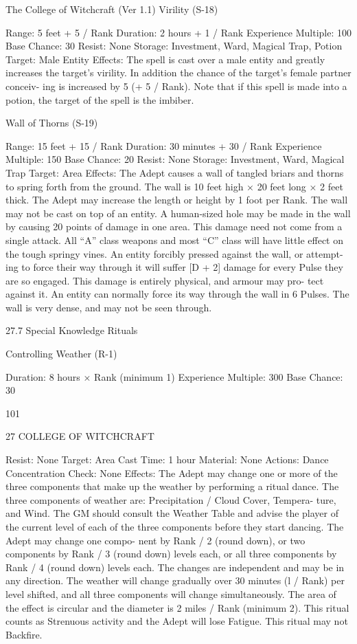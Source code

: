 \begin{Chapter}{The College of Witchcraft (Ver 1.1)}
Virility (S-18) 

Range: 5 feet + 5 / Rank 
Duration: 2 hours + 1 / Rank 
Experience Multiple: 100 
Base Chance: 30%
Resist: None 
Storage: Investment, Ward, Magical Trap, Potion 
Target: Male Entity 
Effects:  The  spell  is  cast  over  a  male  entity  and 
greatly  increases  the  target’s  virility.  In  addition 
the  chance  of  the  target’s  female  partner  conceiv-
ing is increased by 5 (+ 5 / Rank). Note that if this 
spell is made into a potion, the target of the spell is 
the imbiber. 

Wall of Thorns (S-19) 

Range: 15 feet + 15 / Rank 
Duration: 30 minutes + 30 / Rank 
Experience Multiple: 150 
Base Chance: 20%
Resist: None 
Storage: Investment, Ward, Magical Trap 
Target: Area 
Effects:  The  Adept  causes  a  wall  of  tangled  briars 
and  thorns  to  spring  forth  from  the  ground.  The 
wall  is  10  feet  high  ×  20  feet  long  ×  2  feet  thick. 
The  Adept  may  increase  the  length  or  height by  1 
foot per Rank. The wall may not be cast on top of 
an entity. A human-sized hole may be made in the 
wall  by  causing  20  points  of  damage  in  one  area. 
This  damage  need  not  come  from  a  single  attack. 
All  “A”  class  weapons  and  most  “C”  class  will 
have  little  effect  on  the  tough  springy  vines.  An 
entity forcibly pressed against the wall, or attempt-
ing to force their way through it will suffer [D + 2] 
damage  for  every  Pulse  they  are  so  engaged.  This 
damage  is  entirely  physical,  and  armour  may  pro-
tect against it. An entity can normally force its way 
through  the  wall  in  6  Pulses.  The  wall  is  very 
dense, and may not be seen through. 

27.7 Special Knowledge Rituals 

Controlling Weather (R-1) 

Duration: 8 hours × Rank (minimum 1) 
Experience Multiple: 300 
Base Chance: 30%

101 

27 COLLEGE OF WITCHCRAFT 

Resist: None 
Target: Area 
Cast Time: 1 hour 
Material: None 
Actions: Dance 
Concentration Check: None 
Effects: The Adept may change one or more of the 
three  components  that  make  up  the  weather  by 
performing a ritual dance. The three components of 
weather are: Precipitation / Cloud Cover, Tempera-
ture,  and  Wind.  The  GM  should  consult  the 
Weather Table and advise the player of the current 
level  of  each  of  the  three  components  before  they 
start  dancing.  The  Adept  may  change  one  compo-
nent by Rank / 2 (round down), or two components 
by Rank / 3 (round down) levels each, or all three 
components by Rank / 4 (round down) levels each. 
The  changes  are  independent  and  may  be  in  any 
direction.  The  weather  will  change  gradually  over 
30 minutes (l / Rank) per level shifted, and all three 
components  will  change  simultaneously.  The  area 
of the effect is circular and the diameter is 2 miles / 
Rank (minimum 2). This ritual counts as Strenuous 
activity and the Adept will lose Fatigue. This ritual 
may not Backfire. 


\end{Chapter}
